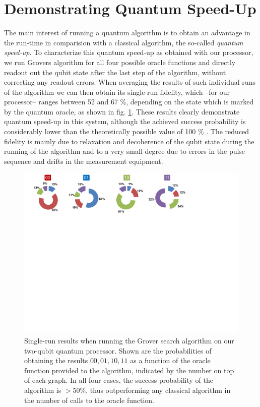 \section{Demonstrating Quantum Speed-Up}

The main interest of running a quantum algorithm is to obtain an advantage in the run-time in comparision with a classical algorithm, the so-called {\it quantum speed-up}. To characterize this quantum speed-up as obtained with our processor, we run Grovers algorithm for all four possible oracle functions and directly readout out the qubit state after the last step of the algorithm, without correcting any readout errors. When averaging the results of such individual runs of the algorithm we can then obtain its single-run fidelity, which --for our processor-- ranges between 52 and 67 \%, depending on the state which is  marked by the quantum oracle, as shown in fig. \ref{fig:grover_single_shot_probabilities}. These results clearly demonstrate quantum speed-up in this system, although the achieved success probability is considerably lower than the theoretically possible value of 100 \% . The reduced fidelity is mainly due to relaxation and decoherence of the qubit state during the running of the algorithm and to a very small degree due to errors in the pulse sequence and drifts in the measurement equipment.

\begin{figure}[ht!]
		\centering
		\includegraphics[width=1.0\textwidth]{./material/papers/grover/figures/grover_algorithm_single_shot_probabilities}
	\caption[Single-run results of the Grover search algorithm]{Single-run results when running the Grover search algorithm on our two-qubit quantum processor. Shown are the probabilities of obtaining the results $00,01,10,11$ as a function of the oracle function provided to the algorithm, indicated by the number on top of each graph. In all four cases, the success probability of the algorithm is $> 50 \%$, thus outperforming any classical algorithm in the number of calls to the oracle function.}
	\label{fig:grover_single_shot_probabilities}
\end{figure}

